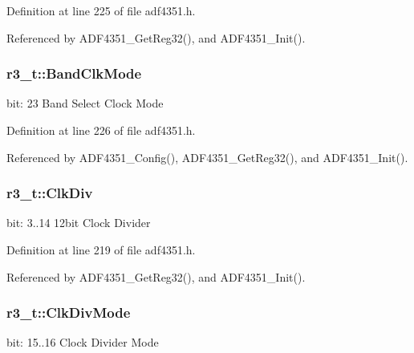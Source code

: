 Definition at line 225 of file adf4351.\+h.



Referenced by A\+D\+F4351\+\_\+\+Get\+Reg32(), and A\+D\+F4351\+\_\+\+Init().

\subsubsection[{\texorpdfstring{Band\+Clk\+Mode}{BandClkMode}}]{ r3\+\_\+t\+::\+Band\+Clk\+Mode}\hypertarget{structr3__t_a47117d4da83d72bd3e84a4f1f9804120}{}\label{structr3__t_a47117d4da83d72bd3e84a4f1f9804120}
bit\+: 23 Band Select Clock Mode 

Definition at line 226 of file adf4351.\+h.



Referenced by A\+D\+F4351\+\_\+\+Config(), A\+D\+F4351\+\_\+\+Get\+Reg32(), and A\+D\+F4351\+\_\+\+Init().

\subsubsection[{\texorpdfstring{Clk\+Div}{ClkDiv}}]{ r3\+\_\+t\+::\+Clk\+Div}\hypertarget{structr3__t_ad53a3132e2a6601f80cb4e455a4dea49}{}\label{structr3__t_ad53a3132e2a6601f80cb4e455a4dea49}
bit\+: 3..14 12bit Clock Divider 

Definition at line 219 of file adf4351.\+h.



Referenced by A\+D\+F4351\+\_\+\+Get\+Reg32(), and A\+D\+F4351\+\_\+\+Init().

\subsubsection[{\texorpdfstring{Clk\+Div\+Mode}{ClkDivMode}}]{ r3\+\_\+t\+::\+Clk\+Div\+Mode}\hypertarget{structr3__t_a29d101adb2cb66623bba16d9783cf752}{}\label{structr3__t_a29d101adb2cb66623bba16d9783cf752}
bit\+: 15..16 Clock Divider Mode 

